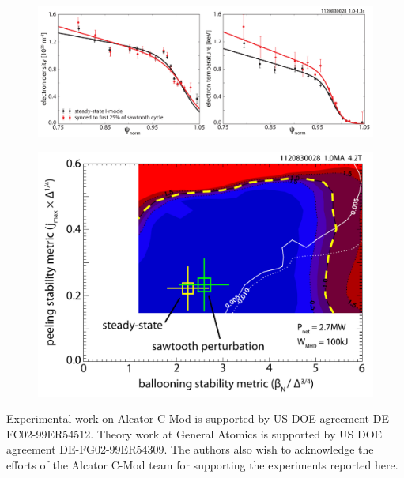 \documentclass[12pt,floatfix,showpacs]{revtex4-1}
\begin{document}
\begin{figure}[p]
 \includegraphics[width=\textwidth]{pdfgraphics/1120830028_prof_stbin.pdf}
 \caption{}
 \label{fig:prof_stbin}
\end{figure}

\begin{figure}[p]
 \includegraphics[width=\textwidth]{pdfgraphics/1120830028_stbin_elite.pdf}
 \caption{}
 \label{fig:1120830028_stbin_elite}
\end{figure}


\begin{acknowledgments}
 Experimental work on Alcator C-Mod is supported by US DOE agreement DE-FC02-99ER54512. Theory work at General Atomics is supported by US DOE agreement DE-FG02-99ER54309.  The authors also wish to acknowledge the efforts of the Alcator C-Mod team for supporting the experiments reported here.
\end{acknowledgments}



\end{document}
